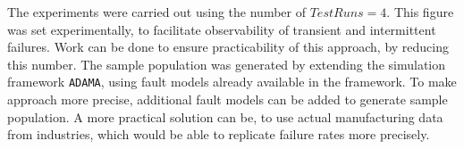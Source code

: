 The experiments were carried out using the number of $TestRuns = 4$. This figure was set experimentally, to facilitate observability of transient and intermittent failures. Work can be done to ensure practicability of this approach, by reducing this number. The sample population was generated by extending the simulation framework \texttt{ADAMA}, using fault models already available in the framework. To make approach more precise, additional fault models can be added to generate sample population. A more practical solution can be, to use actual manufacturing data from industries, which would be able to replicate failure rates more precisely.
